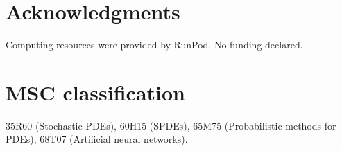\documentclass[review,12pt]{elsarticle}
\begin{document}
\section*{Acknowledgments}

Computing resources were provided by RunPod. No funding declared.

\section*{MSC classification}

35R60 (Stochastic PDEs), 60H15 (SPDEs), 65M75 (Probabilistic
methods for PDEs), 68T07 (Artificial neural networks).




\end{document}
